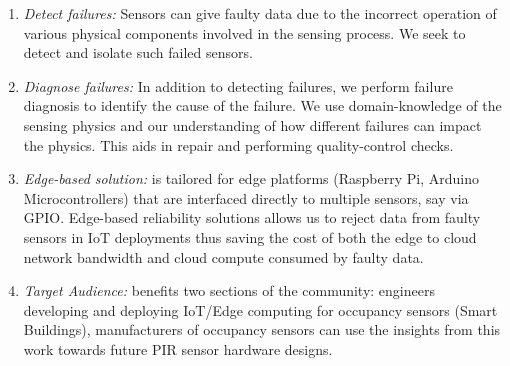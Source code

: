 \begin{enumerate}[leftmargin=*]
	\itemsep0pt
	
	\item {\itshape Detect failures:} Sensors can give faulty data due to the incorrect operation of various physical components involved in the sensing process. We seek to detect and isolate such failed sensors. %
	
	\item {\itshape Diagnose failures:} In addition to detecting failures, we perform failure diagnosis to identify the cause of the failure. We use domain-knowledge of the sensing physics and our understanding of how different failures can impact the physics. This aids in repair and performing quality-control checks.
	
	\item {\itshape Edge-based solution:} \sol is tailored for edge platforms (Raspberry Pi, Arduino Microcontrollers) that are interfaced directly to multiple sensors, say via GPIO. %
	Edge-based reliability solutions allows us to reject data from faulty sensors in IoT deployments thus saving the cost of both \ca the edge to cloud network bandwidth and \cb cloud compute consumed by faulty data.
	
	\item {\itshape Target Audience:} \sol benefits two sections of the community: \ca engineers developing and deploying IoT/Edge computing for occupancy sensors (\eg Smart Buildings), \cb manufacturers of occupancy sensors can use the insights from this work towards future PIR sensor hardware designs.
	
\end{enumerate}

